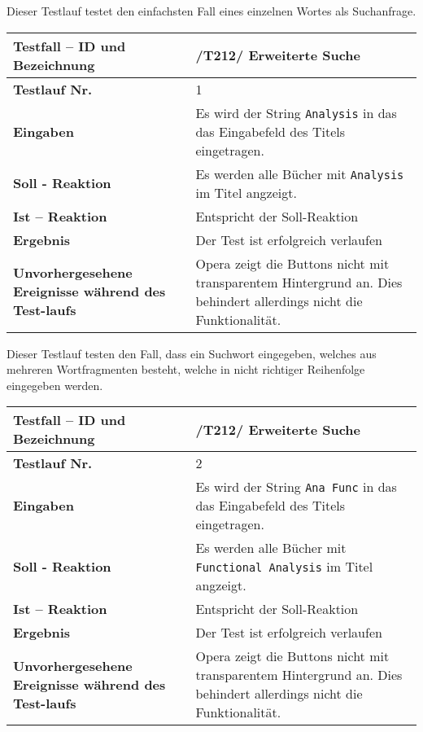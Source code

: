 Dieser Testlauf testet den einfachsten Fall eines einzelnen Wortes als
Suchanfrage.

\begin{longtable}{|p{5cm}|p{10cm}|}
\hline
\textbf{Testfall -- ID und Bezeichnung} & \textnormal{/T212/ Erweiterte
Suche} \\
\hline
\textbf{Testlauf Nr.} & \textnormal{1} \\
\hline
\textbf{Eingaben} & \textnormal{Es wird der String \lstinline{Analysis} in das
das Eingabefeld des Titels eingetragen.} \\
\hline
\textbf{Soll - Reaktion} & \textnormal{Es werden alle Bücher mit
\lstinline{Analysis} im Titel angzeigt.
} \\
\hline
\textbf{Ist -- Reaktion} & \textnormal{Entspricht der Soll-Reaktion} \\
\hline
\textbf{Ergebnis} & \textnormal{Der Test ist erfolgreich verlaufen} \\
\hline
\textbf{Unvorhergesehene Ereignisse w\"ahrend des Test-laufs } &
\textnormal{Opera zeigt die Buttons nicht mit transparentem Hintergrund an. Dies
behindert allerdings nicht die Funktionalität.} \\
\hline
\end{longtable}

Dieser Testlauf testen den Fall, dass ein Suchwort eingegeben, welches aus
mehreren Wortfragmenten besteht, welche in nicht richtiger Reihenfolge
eingegeben werden.

\begin{longtable}{|p{5cm}|p{10cm}|}
\hline
\textbf{Testfall -- ID und Bezeichnung} & \textnormal{/T212/ Erweiterte
Suche} \\
\hline
\textbf{Testlauf Nr.} & \textnormal{2} \\
\hline
\textbf{Eingaben} & \textnormal{Es wird der String \lstinline{Ana Func} in das
das Eingabefeld des Titels eingetragen.} \\
\hline
\textbf{Soll - Reaktion} & \textnormal{Es werden alle Bücher mit
\lstinline{Functional Analysis} im Titel angzeigt.
} \\
\hline
\textbf{Ist -- Reaktion} & \textnormal{Entspricht der Soll-Reaktion} \\
\hline
\textbf{Ergebnis} & \textnormal{Der Test ist erfolgreich verlaufen} \\
\hline
\textbf{Unvorhergesehene Ereignisse w\"ahrend des Test-laufs } &
\textnormal{Opera zeigt die Buttons nicht mit transparentem Hintergrund an. Dies
behindert allerdings nicht die Funktionalität.} \\
\hline
\end{longtable}

